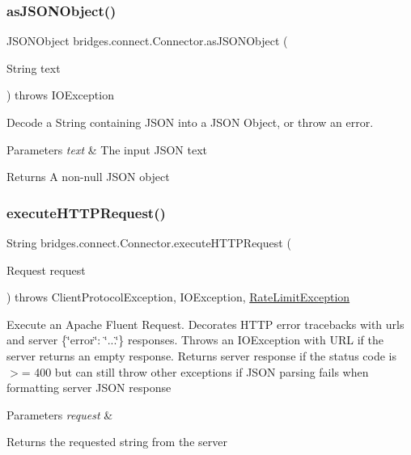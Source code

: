 \subsubsection{\texorpdfstring{as\+J\+S\+O\+N\+Object()}{asJSONObject()}}
{\footnotesize\ttfamily J\+S\+O\+N\+Object bridges.\+connect.\+Connector.\+as\+J\+S\+O\+N\+Object (\begin{DoxyParamCaption}\item[{String}]{text }\end{DoxyParamCaption}) throws I\+O\+Exception}

Decode a String containing J\+S\+ON into a J\+S\+ON Object, or throw an error. 
\begin{DoxyParams}{Parameters}
{\em text} & The input J\+S\+ON text \\
\hline
\end{DoxyParams}
\begin{DoxyReturn}{Returns}
A non-\/null J\+S\+ON object 
\end{DoxyReturn}
\mbox{\label{classbridges_1_1connect_1_1_connector_aabcfde23d155c8c42edb8a1407320bc5}} 
\subsubsection{\texorpdfstring{execute\+H\+T\+T\+P\+Request()}{executeHTTPRequest()}}
{\footnotesize\ttfamily String bridges.\+connect.\+Connector.\+execute\+H\+T\+T\+P\+Request (\begin{DoxyParamCaption}\item[{Request}]{request }\end{DoxyParamCaption}) throws Client\+Protocol\+Exception, I\+O\+Exception, \mbox{\hyperlink{classbridges_1_1validation_1_1_rate_limit_exception}{Rate\+Limit\+Exception}}}

Execute an Apache Fluent Request. Decorates H\+T\+TP error tracebacks with urls and server \{\char`\"{}error\char`\"{}\+: \char`\"{}...\char`\"{}\} responses. Throws an I\+O\+Exception with U\+RL if the server returns an empty response. Returns server response if the status code is $>$= 400 but can still throw other exceptions if J\+S\+ON parsing fails when formatting server J\+S\+ON response 
\begin{DoxyParams}{Parameters}
{\em request} & \\
\hline
\end{DoxyParams}
\begin{DoxyReturn}{Returns}
the requested string from the server 
\end{DoxyReturn}

